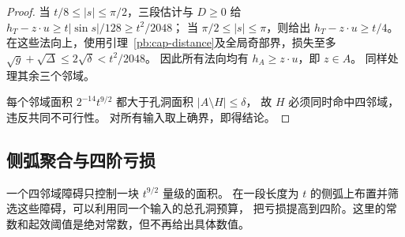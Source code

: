 \begin{proof}
当 $t/8\le|s|\le\pi/2$，三段估计与 $D\ge0$ 给
$h_T-z\cdot u\ge t|\sin s|/128\ge t^2/2048$；
当 $\pi/2\le|s|\le\pi$，则给出 $h_T-z\cdot u\ge t/4$。
在这些法向上，使用引理~\ref{pb:cap-distance}及全局奇部界，损失至多
$\sqrt g+\sqrt\Delta\le2\sqrt\delta<t^2/2048$。
因此所有法向均有 $h_A\ge z\cdot u$，即 $z\in A$。
同样处理其余三个邻域。

每个邻域面积 $2^{-14}t^{9/2}$ 都大于孔洞面积 $|A\setminus H|\le\delta$，
故 $H$ 必须同时命中四邻域，违反共同不可行性。
对所有输入取上确界，即得结论。
\end{proof}

\subsection{侧弧聚合与四阶亏损}

一个四邻域障碍只控制一块 $t^{9/2}$ 量级的面积。
在一段长度为 $t$ 的侧弧上布置并筛选这些障碍，可以利用同一个输入的总孔洞预算，
把亏损提高到四阶。这里的常数和起效阈值是绝对常数，但不再给出具体数值。

